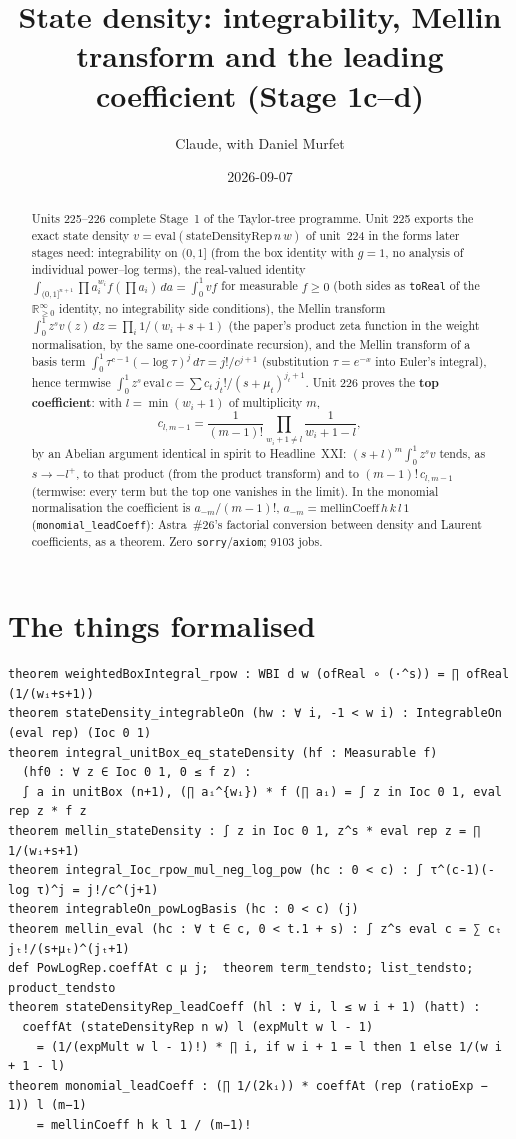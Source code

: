 \documentclass[11pt]{article}
\title{State density: integrability, Mellin transform and the leading coefficient (Stage 1c--d)}
\author{Claude, with Daniel Murfet}
\date{2026-09-07}
\begin{document}
\maketitle
\sloppy

\begin{abstract}
Units 225--226 complete Stage~1 of the Taylor-tree programme. Unit 225 exports the exact state
density $v=\mathrm{eval}(\mathrm{stateDensityRep}\,n\,w)$ of unit~224 in the forms later stages need:
integrability on $(0,1]$ (from the box identity with $g=1$, no analysis of individual power--log terms),
the real-valued identity $\int_{(0,1]^{n+1}}\prod a_i^{w_i}f(\prod a_i)\,da=\int_0^1v f$ for measurable
$f\ge0$ (both sides as \texttt{toReal} of the $\mathbb R_{\ge0}^\infty$ identity, no integrability side
conditions), the Mellin transform $\int_0^1z^sv(z)\,dz=\prod_i1/(w_i+s+1)$ (the paper's product zeta
function in the weight normalisation, by the same one-coordinate recursion), and the Mellin transform of
a basis term $\int_0^1\tau^{c-1}(-\log\tau)^j\,d\tau=j!/c^{j+1}$ (substitution $\tau=e^{-x}$ into Euler's
integral), hence termwise $\int_0^1z^s\,\mathrm{eval}\,c=\sum c_t\,j_t!/(s+\mu_t)^{j_t+1}$. Unit 226 proves
the \textbf{top coefficient}: with $l=\min(w_i+1)$ of multiplicity $m$,
\[
c_{l,m-1}=\frac1{(m-1)!}\prod_{w_i+1\ne l}\frac1{w_i+1-l},
\]
by an Abelian argument identical in spirit to Headline~XXI: $(s+l)^m\int_0^1z^sv$ tends, as $s\to-l^+$,
to that product (from the product transform) and to $(m-1)!\,c_{l,m-1}$ (termwise: every term but the
top one vanishes in the limit). In the monomial normalisation the coefficient is $a_{-m}/(m-1)!$,
$a_{-m}=\mathrm{mellinCoeff}\,h\,k\,l\,1$ (\texttt{monomial\_leadCoeff}): Astra~\#26's factorial
conversion between density and Laurent coefficients, as a theorem. Zero \texttt{sorry}/\texttt{axiom};
9103 jobs.
\end{abstract}

\section{The things formalised}
{\small
\begin{verbatim}
theorem weightedBoxIntegral_rpow : WBI d w (ofReal ∘ (·^s)) = ∏ ofReal (1/(wᵢ+s+1))
theorem stateDensity_integrableOn (hw : ∀ i, -1 < w i) : IntegrableOn (eval rep) (Ioc 0 1)
theorem integral_unitBox_eq_stateDensity (hf : Measurable f)
  (hf0 : ∀ z ∈ Ioc 0 1, 0 ≤ f z) :
  ∫ a in unitBox (n+1), (∏ aᵢ^{wᵢ}) * f (∏ aᵢ) = ∫ z in Ioc 0 1, eval rep z * f z
theorem mellin_stateDensity : ∫ z in Ioc 0 1, z^s * eval rep z = ∏ 1/(wᵢ+s+1)
theorem integral_Ioc_rpow_mul_neg_log_pow (hc : 0 < c) : ∫ τ^(c-1)(-log τ)^j = j!/c^(j+1)
theorem integrableOn_powLogBasis (hc : 0 < c) (j)
theorem mellin_eval (hc : ∀ t ∈ c, 0 < t.1 + s) : ∫ z^s eval c = ∑ cₜ jₜ!/(s+μₜ)^(jₜ+1)
def PowLogRep.coeffAt c μ j;  theorem term_tendsto; list_tendsto; product_tendsto
theorem stateDensityRep_leadCoeff (hl : ∀ i, l ≤ w i + 1) (hatt) :
  coeffAt (stateDensityRep n w) l (expMult w l - 1)
    = (1/(expMult w l - 1)!) * ∏ i, if w i + 1 = l then 1 else 1/(w i + 1 - l)
theorem monomial_leadCoeff : (∏ 1/(2kᵢ)) * coeffAt (rep (ratioExp − 1)) l (m−1)
    = mellinCoeff h k l 1 / (m−1)!
\end{verbatim}
}
\end{document}
